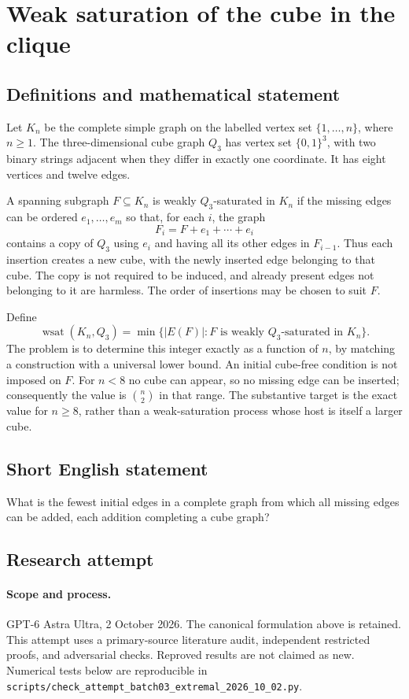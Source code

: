 \documentclass[11pt,a4paper]{article}
\begin{document}
\section*{Weak saturation of the cube in the clique}\label{statement}

\subsection{Definitions and mathematical statement}
Let $K_n$ be the complete simple graph on the labelled vertex set
$\{1,\ldots,n\}$, where $n\ge1$. The three-dimensional cube graph $Q_3$
has vertex set $\{0,1\}^3$, with two binary strings adjacent when they
differ in exactly one coordinate. It has eight vertices and twelve
edges.

A spanning subgraph $F\subseteq K_n$ is weakly $Q_3$-saturated in $K_n$
if the missing edges can be ordered $e_1,\ldots,e_m$ so that, for each
$i$, the graph
\[
                   F_i=F+e_1+\cdots+e_i
\]
contains a copy of $Q_3$ using $e_i$ and having all its other edges in
$F_{i-1}$. Thus each insertion creates a new cube, with the newly
inserted edge belonging to that cube. The copy is not required to be
induced, and already present edges not belonging to it are harmless.
The order of insertions may be chosen to suit $F$.

Define
\[
 \operatorname{wsat}(K_n,Q_3)=
       \min\{|E(F)|:F\text{ is weakly }Q_3\text{-saturated in }K_n\}.
\]
The problem is to determine this integer exactly as a function of $n$,
by matching a construction with a universal lower bound. An initial
cube-free condition is not imposed on $F$. For $n<8$ no cube can appear,
so no missing edge can be inserted; consequently the value is
$\binom n2$ in that range. The substantive target is the exact value
for $n\ge8$, rather than a weak-saturation process whose host is itself
a larger cube.
\subsection{Short English statement}
What is the fewest initial edges in a complete graph from which all missing edges can be added, each addition completing a cube graph?
\subsection{Research attempt}
\paragraph{Scope and process.}
GPT-6 Astra Ultra, 2 October 2026. The canonical formulation above is retained. This attempt uses a primary-source literature audit, independent restricted proofs, and adversarial checks. Reproved results are not claimed as new. Numerical tests below are reproducible in \texttt{scripts/check\_attempt\_batch03\_extremal\_2026\_10\_02.py}.
\end{document}
